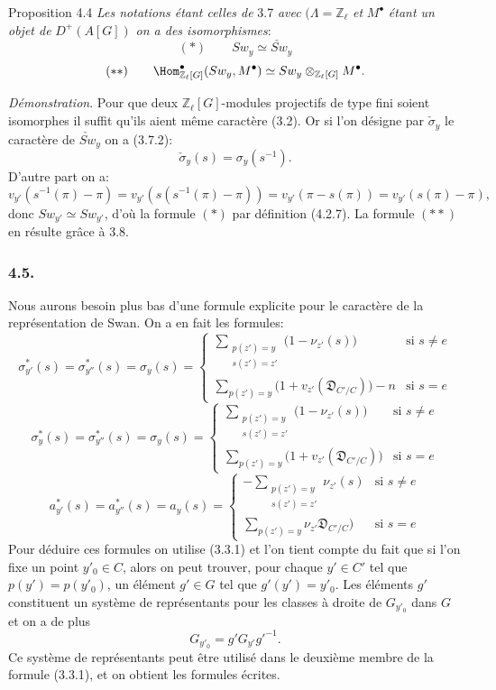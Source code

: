 \begin{statement}{Proposition 4.4}
\emph{Les notations étant celles de} 3.7 \emph{avec} $(\Lambda=\mathbb{Z}_\ell$ \emph{et} $M^\bullet$ \emph{étant un objet de} $D^+(A[G])$ \emph{on a des isomorphismes}:
\[
(*)\qquad Sw_y\simeq \check{Sw}_y
\]
\[
(**)\qquad
\Hom^\bullet_{\mathbb{Z}_\ell[G]}(Sw_y,M^\bullet)
\simeq Sw_y\otimes_{\mathbb{Z}_\ell[G]}M^\bullet.
\]
\end{statement}

\emph{Démonstration}. Pour que deux $\mathbb{Z}_\ell[G]$-modules projectifs de type fini soient isomorphes il suffit qu'ils aient même caractère (3.2). Or si l'on désigne par $\check\sigma_y$ le caractère de $\check{Sw}_y$ on a (3.7.2):
\[
\check\sigma_y(s)=\sigma_y(s^{-1}).
\]
D'autre part on a:
\[
v_{y'}(s^{-1}(\pi)-\pi)
=v_{y'}(s(s^{-1}(\pi)-\pi))
=v_{y'}(\pi-s(\pi))
=v_{y'}(s(\pi)-\pi),
\]
donc $Sw_{y'}\simeq Sw_{y'}$, d'où la formule $(*)$ par définition (4.2.7). La formule $(**)$ en résulte grâce à 3.8.

\subsubsection*{4.5.}

Nous
aurons besoin plus bas d'une formule explicite pour le caractère de la représentation de Swan. On a en fait les formules:
\[
\sigma^{*}_{y'}(s)=\sigma^{*}_{y''}(s)=\sigma_y(s)=
\begin{cases}
\displaystyle\sum_{\substack{p(z')=y\\s(z')=z'}}\bigl(1-\nu_{z'}(s)\bigr)& \text{si } s\ne e\\[0.8em]
\displaystyle\sum_{p(z')=y}\bigl(1+v_{z'}(\mathfrak{D}_{C'/C})\bigr)-n& \text{si } s=e
\end{cases}
\tag{4.5.1}
\]
\[
\sigma^{*}_{y}(s)=\sigma^{*}_{y''}(s)=\sigma_y(s)=
\begin{cases}
\displaystyle\sum_{\substack{p(z')=y\\s(z')=z'}}\bigl(1-\nu_{z'}(s)\bigr)& \text{si } s\ne e\\[0.8em]
\displaystyle\sum_{p(z')=y}\bigl(1+v_{z'}(\mathfrak{D}_{C'/C})\bigr)& \text{si } s=e
\end{cases}
\tag{4.5.2}
\]
\[
a^{*}_{y'}(s)=a^{*}_{y''}(s)=a_y(s)=
\begin{cases}
\displaystyle-\sum_{\substack{p(z')=y\\s(z')=z'}}\nu_{z'}(s)& \text{si } s\ne e\\[0.8em]
\displaystyle\sum_{p(z')=y}\nu_{z'}\mathfrak{D}_{C'/C})& \text{si } s=e
\end{cases}
\tag{4.5.3}
\]
Pour déduire ces formules on utilise (3.3.1) et l'on tient compte du fait que si l'on fixe un point $y'_0\in C$, alors on peut trouver, pour chaque $y'\in C'$ tel que $p(y')=p(y'_0)$, un élément $g'\in G$ tel que $g'(y')=y'_0$. Les éléments $g'$ constituent un système de représentants pour les classes à droite de $G_{y'_0}$ dans $G$ et on a de plus
\[
G_{y'_0}=g'G_{y'}g'^{-1}.
\]
Ce système de représentants peut être utilisé dans le deuxième membre de la formule (3.3.1), et on obtient les formules écrites.

